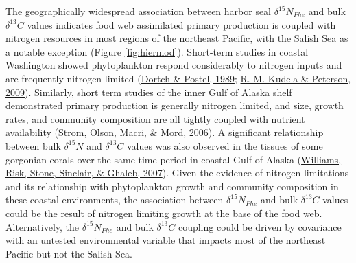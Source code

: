 \documentclass [11pt, proquest] {uwthesis}[2015/03/03]
\begin{document}
The geographically widespread association between harbor seal \(\delta^{15}N_{Phe}\) and bulk \(\delta^{13}C\) values indicates food web assimilated primary production is coupled with nitrogen resources in most regions of the northeast Pacific, with the Salish Sea as a notable exception (Figure \ref{fig:hiermod}). Short-term studies in coastal Washington showed phytoplankton respond considerably to nitrogen inputs and are frequently nitrogen limited (\protect\hyperlink{ref-Dortch1989}{Dortch \& Postel, 1989}; \protect\hyperlink{ref-Kudela2009}{R. M. Kudela \& Peterson, 2009}). Similarly, short term studies of the inner Gulf of Alaska shelf demonstrated primary production is generally nitrogen limited, and size, growth rates, and community composition are all tightly coupled with nutrient availability (\protect\hyperlink{ref-Strom2006}{Strom, Olson, Macri, \& Mord, 2006}). A significant relationship between bulk \(\delta^{15}N\) and \(\delta^{13}C\) values was also observed in the tissues of some gorgonian corals over the same time period in coastal Gulf of Alaska (\protect\hyperlink{ref-Williams2007}{Williams, Risk, Stone, Sinclair, \& Ghaleb, 2007}). Given the evidence of nitrogen limitations and its relationship with phytoplankton growth and community composition in these coastal environments, the association between \(\delta^{15}N_{Phe}\) and bulk \(\delta^{13}C\) values could be the result of nitrogen limiting growth at the base of the food web. Alternatively, the \(\delta^{15}N_{Phe}\) and bulk \(\delta^{13}C\) coupling could be driven by covariance with an untested environmental variable that impacts most of the northeast Pacific but not the Salish Sea.
\end{document}
